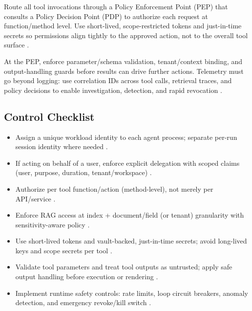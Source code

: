 \begin{TNtwocol}
      Route all tool invocations through a Policy Enforcement Point (PEP) that consults a Policy Decision Point (PDP) to authorize each request at function/method level. Use short-lived, scope-restricted tokens and just-in-time secrets so permissions align tightly to the approved action, not to the overall tool surface \cite{NIST_SP800_207,CIS_Controls_v8_1}.

      At the PEP, enforce parameter/schema validation, tenant/context binding, and output-handling guards before results can drive further actions. Telemetry must go beyond logging: use correlation IDs across tool calls, retrieval traces, and policy decisions to enable investigation, detection, and rapid revocation \cite{OWASP_LLM_Top10,CIS_Controls_v8_1}.

      \subsection{Control Checklist}

      \begin{itemize}
            \item Assign a unique workload identity to each agent process; separate per-run session identity where needed \cite{NIST_SP800_207}.

            \item If acting on behalf of a user, enforce explicit delegation with scoped claims (user, purpose, duration, tenant/workspace) \cite{NIST_SP800_207}.

            \item Authorize per tool function/action (method-level), not merely per API/service \cite{NIST_SP800_207}.

            \item Enforce RAG access at index + document/field (or tenant) granularity with sensitivity-aware policy \cite{NIST_SP800_207,CIS_Controls_v8_1}.

            \item Use short-lived tokens and vault-backed, just-in-time secrets; avoid long-lived keys and scope secrets per tool \cite{CIS_Controls_v8_1}.

            \item Validate tool parameters and treat tool outputs as untrusted; apply safe output handling before execution or rendering \cite{OWASP_LLM_Top10}.

            \item Implement runtime safety controls: rate limits, loop circuit breakers, anomaly detection, and emergency revoke/kill switch \cite{CIS_Controls_v8_1}.


\end{itemize}
\end{TNtwocol}
